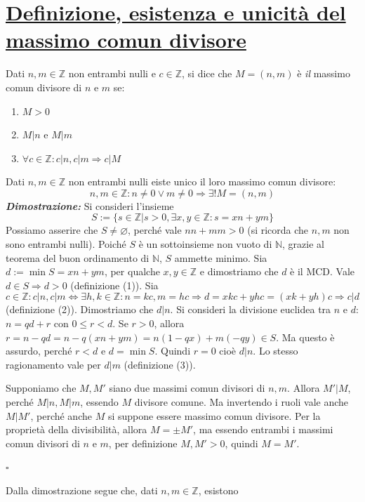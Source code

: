 \documentclass[oneside]{book}
\theoremstyle{remark}
\newcommand{\teorema}[1]{\section{\underline{#1}}}
\newcommand{\cvd}{\begin{flushright}$\square$\end{flushright}} %
\begin{document}
\teorema{Definizione, esistenza e unicità del massimo comun divisore}
\begin{tcolorbox}[colback=yellow!30, colframe=yellow!30!black, title=Massimo Comun Divisore]
Dati $n,m \in \mathbb{Z}$ non entrambi nulli e $c\in\mathbb{Z}$, si dice che
$M = (n,m)$ è \textit{il} massimo comun divisore di $n$ e $m$ se:
\begin{enumerate}
    \item $M>0$
    \item $M|n$ e $M|m$
    \item $\forall c\in\mathbb{Z}:c|n, c|m \Longrightarrow c|M$
\end{enumerate}
\end{tcolorbox}
\begin{tcolorbox}[title={Esistenza e unicità del massimo comun divisore}]
Dati $n,m \in \mathbb{Z}$ non entrambi nulli eiste unico il loro
massimo comun divisore: \[ n,m \in \mathbb{Z}: n \not = 0 \vee m \not = 0 \Longrightarrow \exists! M = (n,m) \]
\emph{\textbf{Dimostrazione:}}  Si consideri l'insieme
\[S := \{s \in \mathbb{Z}| s > 0, \exists x,y \in \mathbb{Z}: s = xn + ym\}\]
Possiamo asserire che $S \not = \varnothing$, perché vale $nn + mm > 0$
(si ricorda che $n,m$ non sono entrambi nulli). Poiché $S$ è un sottoinsieme non vuoto
di $\mathbb{N}$, grazie al teorema del buon ordinamento di $\mathbb{N}$, $S$
ammette minimo. Sia $d:= \min S = xn + ym$, per qualche $x,y\in\mathbb{Z}$ e dimostriamo che
$d$ è il MCD. Vale $d\in S\Longrightarrow d>0$ (definizione (1)). Sia \[ c\in\mathbb{Z}:
c|n,c|m \Longleftrightarrow \exists h,k\in\mathbb{Z}:n=kc,m=hc \Longrightarrow d=xkc+yhc=(xk+yh)c \Longrightarrow c|d \]
(definizione (2)).  Dimostriamo che $d|n$.
Si consideri la divisione euclidea tra $n$ e $d$: $n = qd + r$ con
$0 \leq r < d$. Se $r > 0$, allora $r = n - qd = n - q(xn + ym) = n(1-qx) +
m(-qy) \in S$. Ma questo è assurdo, perché $r<d$ e $d = \min S$. Quindi
$r=0$ cioè $d|n$. Lo stesso ragionamento vale per $d|m$ (definizione (3)).

 Supponiamo che $M,M'$ siano due massimi comun
divisori di $n,m$. Allora $M'|M$, perché $M|n,M|m$, essendo $M$ divisore
comune. Ma invertendo i ruoli vale anche $M|M'$, perché anche $M$ si
suppone essere massimo comun divisore. Per la proprietà della divisibilità,
allora $M = \pm M'$, ma essendo entrambi i massimi comun divisori di $n$
e $m$, per definizione $M,M'>0$, quindi $M=M'$.
\cvd
\end{tcolorbox}
Dalla dimostrazione segue che, dati $n,m\in\mathbb{Z}$, esistono
\end{document}
